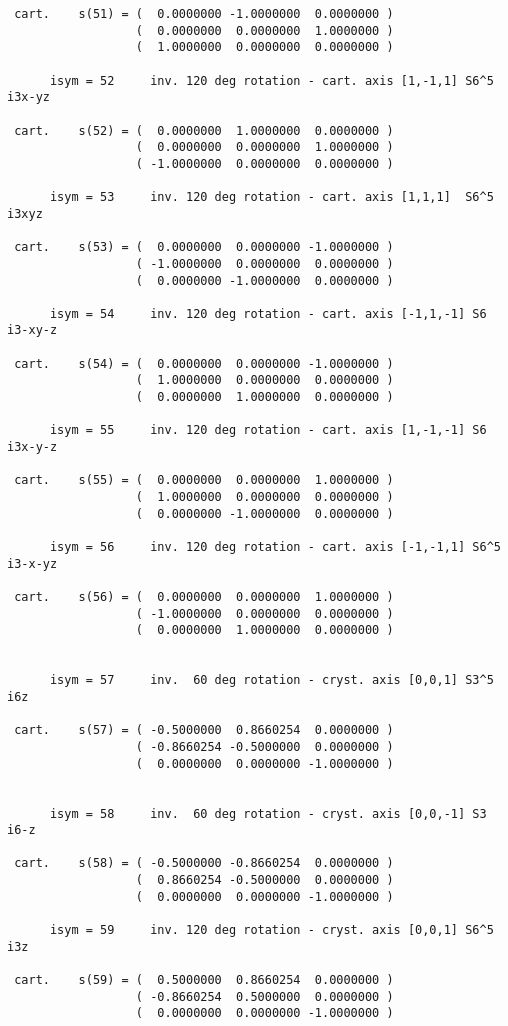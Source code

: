 \documentclass[12pt,a4paper]{article}
\begin{document}
\begin{footnotesize}
\begin{verbatim}
 cart.    s(51) = (  0.0000000 -1.0000000  0.0000000 )
                  (  0.0000000  0.0000000  1.0000000 )
                  (  1.0000000  0.0000000  0.0000000 )

      isym = 52     inv. 120 deg rotation - cart. axis [1,-1,1] S6^5   i3x-yz

 cart.    s(52) = (  0.0000000  1.0000000  0.0000000 )
                  (  0.0000000  0.0000000  1.0000000 )
                  ( -1.0000000  0.0000000  0.0000000 )

      isym = 53     inv. 120 deg rotation - cart. axis [1,1,1]  S6^5   i3xyz

 cart.    s(53) = (  0.0000000  0.0000000 -1.0000000 )
                  ( -1.0000000  0.0000000  0.0000000 )
                  (  0.0000000 -1.0000000  0.0000000 )

      isym = 54     inv. 120 deg rotation - cart. axis [-1,1,-1] S6    i3-xy-z

 cart.    s(54) = (  0.0000000  0.0000000 -1.0000000 )
                  (  1.0000000  0.0000000  0.0000000 )
                  (  0.0000000  1.0000000  0.0000000 )

      isym = 55     inv. 120 deg rotation - cart. axis [1,-1,-1] S6    i3x-y-z

 cart.    s(55) = (  0.0000000  0.0000000  1.0000000 )
                  (  1.0000000  0.0000000  0.0000000 )
                  (  0.0000000 -1.0000000  0.0000000 )

      isym = 56     inv. 120 deg rotation - cart. axis [-1,-1,1] S6^5  i3-x-yz

 cart.    s(56) = (  0.0000000  0.0000000  1.0000000 )
                  ( -1.0000000  0.0000000  0.0000000 )
                  (  0.0000000  1.0000000  0.0000000 )


      isym = 57     inv.  60 deg rotation - cryst. axis [0,0,1] S3^5   i6z

 cart.    s(57) = ( -0.5000000  0.8660254  0.0000000 )
                  ( -0.8660254 -0.5000000  0.0000000 )
                  (  0.0000000  0.0000000 -1.0000000 )


      isym = 58     inv.  60 deg rotation - cryst. axis [0,0,-1] S3    i6-z

 cart.    s(58) = ( -0.5000000 -0.8660254  0.0000000 )
                  (  0.8660254 -0.5000000  0.0000000 )
                  (  0.0000000  0.0000000 -1.0000000 )

      isym = 59     inv. 120 deg rotation - cryst. axis [0,0,1] S6^5   i3z

 cart.    s(59) = (  0.5000000  0.8660254  0.0000000 )
                  ( -0.8660254  0.5000000  0.0000000 )
                  (  0.0000000  0.0000000 -1.0000000 )


\end{verbatim}
\end{footnotesize}
\end{document}
